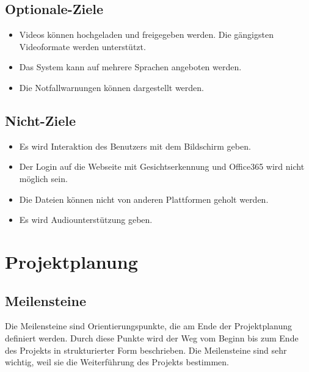 \subsection{Optionale-Ziele}

\begin{itemize}
	
	\item Videos k\"{o}nnen hochgeladen und freigegeben werden. Die g\"{a}ngigsten Videoformate werden unterst\"{u}tzt.  
	
	\item Das System kann auf mehrere Sprachen angeboten werden.  
	
	\item Die Notfallwarnungen k\"{o}nnen dargestellt werden.  
	
\end{itemize}

\subsection{Nicht-Ziele}

\begin{itemize}
	
	\item Es wird Interaktion des Benutzers mit dem Bildschirm geben.   
	
	\item Der Login auf die Webseite mit Gesichtserkennung und Office365 wird nicht m\"{o}glich sein.  
	
	\item Die Dateien k\"{o}nnen nicht von anderen Plattformen geholt werden.   
	
	
	\item Es wird Audiounterst\"{u}tzung geben. 
	
	
\end{itemize}



\section{Projektplanung}

\subsection{Meilensteine}
Die Meilensteine sind Orientierungspunkte, die am Ende der Projektplanung definiert werden. Durch diese Punkte wird der Weg vom Beginn bis zum Ende des Projekts in strukturierter Form beschrieben. Die Meilensteine sind sehr wichtig, weil sie die Weiterf\"{u}hrung des Projekts bestimmen.

